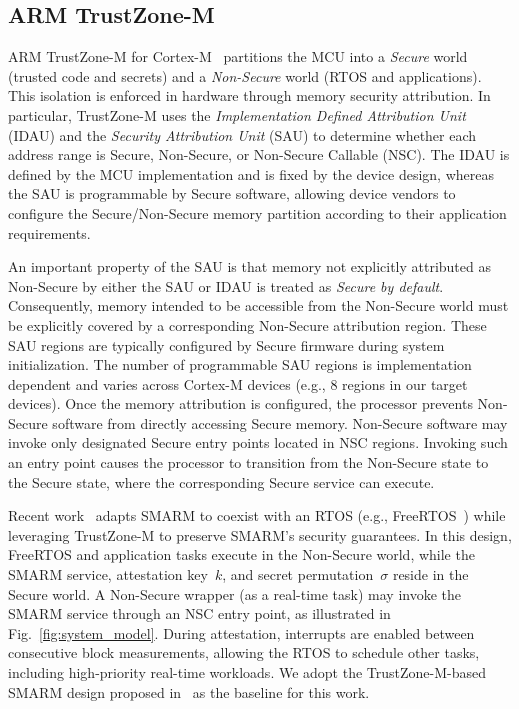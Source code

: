 \documentclass[conference]{IEEEtran}
\begin{document}
\subsection{ARM TrustZone-M}

% 

ARM TrustZone-M for Cortex-M~\cite{trustzone2025} partitions the MCU into a \emph{Secure} world (trusted code and secrets) and a
\emph{Non-Secure} world (RTOS and applications).
This isolation is enforced in hardware through memory security attribution. 
In particular, TrustZone-M uses the \emph{Implementation Defined Attribution Unit} (IDAU) and the \emph{Security Attribution Unit} (SAU) to determine whether each address range is Secure, Non-Secure, or Non-Secure Callable (NSC). The IDAU is defined by the MCU implementation and is fixed by the device design, whereas the SAU is programmable by Secure software, allowing device vendors to configure the Secure/Non-Secure memory partition according to their application requirements.

An important property of the SAU is that memory not explicitly attributed as Non-Secure by either the SAU or IDAU is treated as \emph{Secure by default}. Consequently, memory intended to be accessible from the Non-Secure world must be explicitly covered by a corresponding Non-Secure attribution region. These SAU regions are typically configured by Secure firmware during system initialization. The number of programmable SAU regions is implementation dependent and varies across Cortex-M devices (e.g., 8 regions in our target devices).
%
Once the memory attribution is configured, the processor prevents Non-Secure software from directly accessing Secure memory. 
Non-Secure software may invoke only designated Secure entry points located in NSC regions. Invoking such an entry point causes the processor to transition from the Non-Secure state to the Secure state, where the corresponding Secure service can execute.

Recent work~\cite{smarmplus2026} adapts SMARM to coexist with an RTOS (e.g., FreeRTOS~\cite{freertos2025}) while leveraging TrustZone-M to preserve SMARM's security guarantees. In this design, FreeRTOS and application tasks execute in the Non-Secure world, while the SMARM service, attestation key~$k$, and secret permutation~$\sigma$ reside in the Secure world. 
A Non-Secure wrapper (as a real-time task) may invoke the SMARM service through an NSC entry point, as illustrated in Fig.~\ref{fig:system_model}. During attestation, interrupts are enabled between consecutive block measurements, allowing the RTOS to schedule other tasks, including high-priority real-time workloads. We adopt the TrustZone-M-based SMARM design proposed in~\cite{smarmplus2026} as the baseline for this work.
\end{document}
